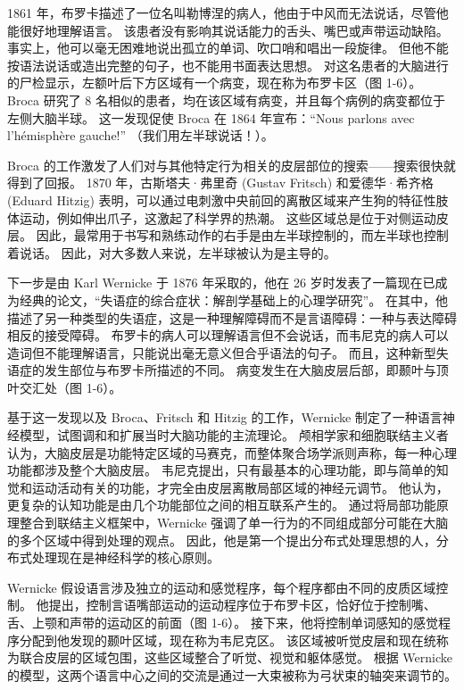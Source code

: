 1861 年，布罗卡描述了一位名叫勒博涅的病人，他由于中风而无法说话，尽管他能很好地理解语言。 该患者没有影响其说话能力的舌头、嘴巴或声带运动缺陷。 事实上，他可以毫无困难地说出孤立的单词、吹口哨和唱出一段旋律。 但他不能按语法说话或造出完整的句子，也不能用书面表达思想。 对这名患者的大脑进行的尸检显示，左额叶后下方区域有一个病变，现在称为布罗卡区（图 1-6）。 Broca 研究了 8 名相似的患者，均在该区域有病变，并且每个病例的病变都位于左侧大脑半球。 这一发现促使 Broca 在 1864 年宣布：“Nous parlons avec l’hémisphère gauche!” （我们用左半球说话！）。

Broca 的工作激发了人们对与其他特定行为相关的皮层部位的搜索——搜索很快就得到了回报。 1870 年，古斯塔夫·弗里奇 (Gustav Fritsch) 和爱德华·希齐格 (Eduard Hitzig) 表明，可以通过电刺激中央前回的离散区域来产生狗的特征性肢体运动，例如伸出爪子，这激起了科学界的热潮。 这些区域总是位于对侧运动皮层。 因此，最常用于书写和熟练动作的右手是由左半球控制的，而左半球也控制着说话。 因此，对大多数人来说，左半球被认为是主导的。

下一步是由 Karl Wernicke 于 1876 年采取的，他在 26 岁时发表了一篇现在已成为经典的论文，“失语症的综合症状：解剖学基础上的心理学研究”。 在其中，他描述了另一种类型的失语症，这是一种理解障碍而不是言语障碍：一种与表达障碍相反的接受障碍。 布罗卡的病人可以理解语言但不会说话，而韦尼克的病人可以造词但不能理解语言，只能说出毫无意义但合乎语法的句子。 而且，这种新型失语症的发生部位与布罗卡所描述的不同。 病变发生在大脑皮层后部，即颞叶与顶叶交汇处（图 1-6）。

基于这一发现以及 Broca、Fritsch 和 Hitzig 的工作，Wernicke 制定了一种语言神经模型，试图调和和扩展当时大脑功能的主流理论。 颅相学家和细胞联结主义者认为，大脑皮层是功能特定区域的马赛克，而整体聚合场学派则声称，每一种心理功能都涉及整个大脑皮层。 韦尼克提出，只有最基本的心理功能，即与简单的知觉和运动活动有关的功能，才完全由皮层离散局部区域的神经元调节。 他认为，更复杂的认知功能是由几个功能部位之间的相互联系产生的。 通过将局部功能原理整合到联结主义框架中，Wernicke 强调了单一行为的不同组成部分可能在大脑的多个区域中得到处理的观点。 因此，他是第一个提出分布式处理思想的人，分布式处理现在是神经科学的核心原则。

Wernicke 假设语言涉及独立的运动和感觉程序，每个程序都由不同的皮质区域控制。 他提出，控制言语嘴部运动的运动程序位于布罗卡区，恰好位于控制嘴、舌、上颚和声带的运动区的前面（图 1-6）。 接下来，他将控制单词感知的感觉程序分配到他发现的颞叶区域，现在称为韦尼克区。 该区域被听觉皮层和现在统称为联合皮层的区域包围，这些区域整合了听觉、视觉和躯体感觉。 根据 Wernicke 的模型，这两个语言中心之间的交流是通过一大束被称为弓状束的轴突来调节的。

